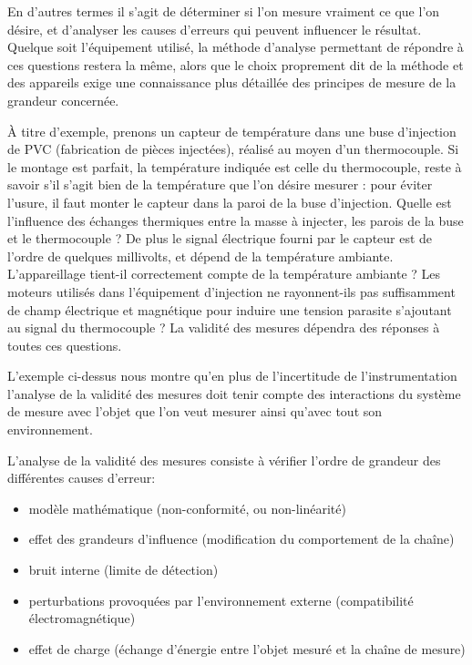\documentclass[main.tex]{subfiles}
\begin{document}
En d'autres termes il s'agit de déterminer si l'on mesure vraiment ce que l'on désire, et d'analyser les causes d'erreurs qui peuvent influencer le résultat. Quelque soit l'équipement utilisé, la méthode d'analyse permettant de répondre à ces questions restera la même, alors que le choix proprement dit de la méthode et des appareils exige une connaissance plus détaillée des principes de mesure de la grandeur concernée.

À titre d'exemple, prenons un capteur de température dans une buse d'injection de PVC (fabrication de pièces injectées), réalisé au moyen d'un thermocouple. Si le montage est parfait, la température indiquée est celle du thermocouple, reste à savoir s'il s'agit bien de la température que l'on désire mesurer : pour éviter l'usure, il faut monter le capteur dans la paroi de la buse d'injection. Quelle est l'influence des échanges thermiques entre la masse à injecter, les parois de la buse et le thermocouple ? De plus le signal électrique fourni par le capteur est de l'ordre de quelques millivolts, et dépend de la température ambiante. L'appareillage tient-il correctement compte de la température ambiante ? Les moteurs utilisés dans l'équipement d'injection ne rayonnent-ils pas suffisamment de champ électrique et magnétique pour induire une tension parasite s'ajoutant au signal du thermocouple ? La validité des mesures dépendra des réponses à toutes ces questions.

L'exemple ci-dessus nous montre qu'en plus de l'incertitude de l'instrumentation l'analyse de la validité des mesures doit tenir compte des interactions du système de mesure avec l'objet que l'on veut mesurer ainsi qu'avec tout son environnement.

L'analyse de la validité des mesures consiste à vérifier l'ordre de grandeur des différentes causes d'erreur:

\begin{itemize}
    \item modèle mathématique (non-conformité, ou non-linéarité)
    \item effet des grandeurs d'influence (modification du comportement de la chaîne)
    \item bruit interne (limite de détection)
    \item perturbations provoquées par l'environnement externe (compatibilité électromagnétique)
    \item effet de charge (échange d'énergie entre l'objet mesuré et la chaîne de mesure)
\end{itemize}
\end{document}
